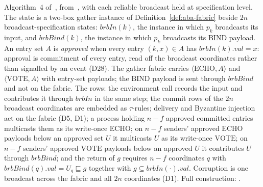 \begin{definition}
  \label{def:aba-gather-mid}
  \leanok
  Algorithm~4 of~\cite{LeslieBP}, from~\cite{AFW25}, with each reliable broadcast held at specification level.
  The state is a two-box gather instance of Definition~\ref{def:aba-fabric} beside $2n$ broadcast-specification states: $\mathit{brbIn}(k)$, the instance in which $p_k$ broadcasts its input, and $\mathit{brbBind}(k)$, the instance in which $p_k$ broadcasts its $\mathrm{BIND}$ payload.
  An entry set $A$ is \emph{approved} when every entry $(k, x) \in A$ has $\mathit{brbIn}(k).val = x$: approval is commitment of every entry, read off the broadcast coordinates rather than signalled by an event (D28).
  The gather fabric carries $\langle\mathrm{ECHO}, A\rangle$ and $\langle\mathrm{VOTE}, A\rangle$ with entry-set payloads; the $\mathrm{BIND}$ payload is sent through $\mathit{brbBind}$ and not on the fabric.
  The rows: the environment call records the input and contributes it through $\mathit{brbIn}$ in the same step; the commit rows of the $2n$ broadcast coordinates are embedded as $\tau$-rules; delivery and Byzantine injection act on the fabric (D5, D1); a process holding $n{-}f$ approved committed entries multicasts them as its write-once $\mathrm{ECHO}$; on $n{-}f$ senders' approved $\mathrm{ECHO}$ payloads below an approved set $U$ it multicasts $U$ as its write-once $\mathrm{VOTE}$; on $n{-}f$ senders' approved $\mathrm{VOTE}$ payloads below an approved $U$ it contributes $U$ through $\mathit{brbBind}$; and the return of $g$ requires $n{-}f$ coordinates $q$ with $\mathit{brbBind}(q).val = U_q \sqsubseteq g$ together with $g \subseteq \mathit{brbIn}(\cdot).val$.
  Corruption is one broadcast across the fabric and all $2n$ coordinates (D1).
  Full construction: .
\end{definition}
